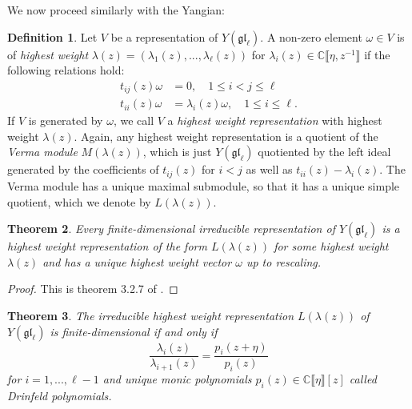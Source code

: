 \documentclass[11pt]{report}
\newtheorem{theorem}{Theorem}[section]
\theoremstyle{definition}
\newtheorem{definition}[theorem]{Definition}
\theoremstyle{remark}
\theoremstyle{remark}
\newcommand{\C}{\mathbb{C}}
\begin{document}
We now proceed similarly with the Yangian:

\begin{definition}
Let $V$ be a representation of $Y(\mathfrak{gl}_\ell)$. A non-zero element $\omega \in V$ is of \emph{highest weight} $\lambda(z) = (\lambda_1(z),...,\lambda_\ell(z))$ for $\lambda_i(z) \in \C\llbracket \eta,z^{-1} \rrbracket$ if the following relations hold:
\begin{align*}
t_{ij}(z) \omega &= 0, \quad 1 \leq i < j \leq \ell \\
t_{ii}(z) \omega &= \lambda_i(z) \omega, \quad 1 \leq i \leq \ell.
\end{align*}
If $V$ is generated by $\omega$, we call $V$ a \emph{highest weight representation} with highest weight $\lambda(z)$. Again, any highest weight representation is a quotient of the \emph{Verma module} $M(\lambda(z))$, which is just $Y(\mathfrak{gl}_\ell)$ quotiented by the left ideal generated by the coefficients of $t_{ij}(z)$ for $i<j$ as well as $t_{ii}(z) - \lambda_i(z)$. The Verma module has a unique maximal submodule, so that it has a unique simple quotient, which we denote by $L(\lambda(z))$.
\end{definition}

\begin{theorem}
Every finite-dimensional irreducible representation of $Y(\mathfrak{gl}_\ell)$ is a highest weight representation of the form $L(\lambda(z))$ for some highest weight $\lambda(z)$ and has a unique highest weight vector $\omega$ up to rescaling.
\end{theorem}

\begin{proof}
This is theorem 3.2.7 of \cite{book:molev}.
\end{proof}

\begin{theorem}
The irreducible highest weight representation $L(\lambda(z))$ of $Y(\mathfrak{gl}_\ell)$ is finite-dimensional if and only if
\begin{equation*}
\frac{\lambda_i(z)}{\lambda_{i+1}(z)} = \frac{p_i(z+\eta)}{p_i(z)}
\end{equation*}
for $i=1,...,\ell-1$ and unique monic polynomials $p_i(z) \in \C\llbracket \eta \rrbracket[z]$ called \emph{Drinfeld polynomials}.
\end{theorem}
\end{document}
